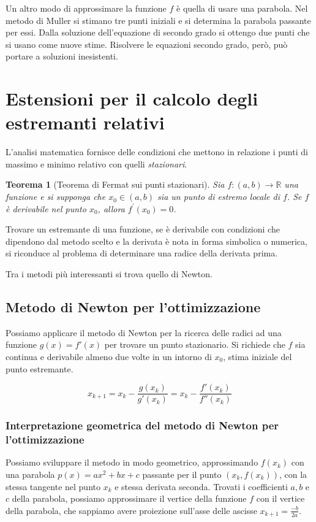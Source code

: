 \documentclass[12pt]{article}
\theoremstyle{plain}%
\newtheorem{thm}{Teorema}[section]
\theoremstyle{definition}
\theoremstyle{remark}
\begin{document}
Un altro modo di approssimare la funzione $f$ è quella di usare una parabola.
Nel metodo di Muller si stimano tre punti iniziali e si determina la parabola
passante per essi. Dalla soluzione dell'equazione di secondo grado si ottengo
due punti che si usano come nuove stime.
Risolvere le equazioni secondo grado, però, può portare a soluzioni inesistenti.

\section{Estensioni per il calcolo degli estremanti relativi}

L'analisi matematica fornisce delle condizioni che mettono in relazione i punti
di massimo e minimo relativo con quelli \textit{stazionari}.

\begin{thm}[Teorema di Fermat sui punti stazionari]
Sia $f :(a, b) \to \mathbb{R}$ una funzione e si supponga che $x_0 \in  (a, b)$
sia un punto di estremo locale di $f$. Se $f$ è derivabile nel punto $x_0$,
allora $f^{\prime}(x_0) = 0$.
\end{thm}

Trovare un estremante di una funzione, se è derivabile con condizioni che
dipendono dal metodo scelto e la derivata è nota in forma simbolica o numerica,
si riconduce al problema di determinare una radice della derivata prima.

Tra i metodi più interessanti si trova quello di Newton.

\subsection{Metodo di Newton per l'ottimizzazione}

Possiamo applicare il metodo di Newton per la ricerca delle radici ad una
funzione $g(x) = f'(x)$ per trovare un punto stazionario. Si richiede che $f$
sia continua e derivabile almeno due volte in un intorno di $x_0$, stima iniziale
del punto estremante.

$$x_{k + 1} = x_k - \frac{g(x_k)}{g'(x_k)} = x_k - \frac{f'(x_k)}{f''(x_k)}$$

\subsubsection[Interpretazione geometrica]{Interpretazione geometrica del metodo di Newton per l'ottimizzazione}

Possiamo sviluppare il metodo in modo geometrico, approssimando $f(x_k)$ con una parabola $p(x) = a x^2 + bx + c$
passante per il punto $\left(x_k, f(x_k)\right)$, con la stessa tangente nel punto $x_k$ e stessa derivata seconda.
Trovati i coefficienti $a, b$ e $c$ della parabola, possiamo approssimare il vertice della funzione $f$
con il vertice della parabola, che sappiamo avere proiezione sull'asse delle ascisse $x_{k+1} = \frac{-b}{2a}$.
\end{document}
